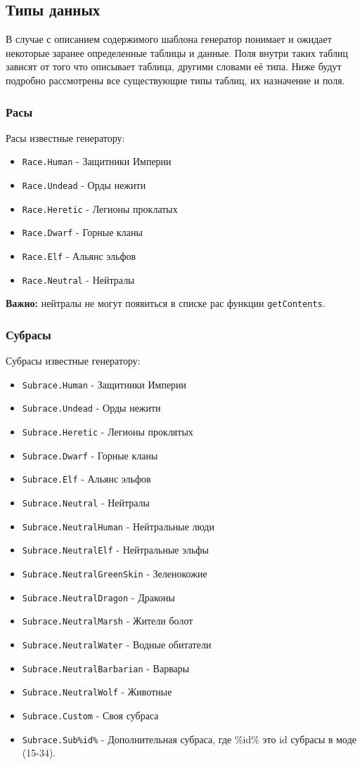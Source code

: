 \subsection{Типы данных}
В случае с описанием содержимого шаблона генератор понимает и ожидает некоторые заранее определенные таблицы и данные. Поля внутри таких таблиц зависят от того что описывает таблица, другими словами её типа. Ниже будут подробно рассмотрены все существующие типы таблиц, их назначение и поля.

\subsubsection{Расы}
\label{raceTypes}
Расы известные генератору:
\begin{itemize}
\item \texttt{Race.Human} - Защитники Империи
\item \texttt{Race.Undead} - Орды нежити
\item \texttt{Race.Heretic} - Легионы проклатых
\item \texttt{Race.Dwarf} - Горные кланы
\item \texttt{Race.Elf} - Альянс эльфов
\item \texttt{Race.Neutral} - Нейтралы
\end{itemize}
\textbf{Важно:} нейтралы не могут появиться в списке рас функции \texttt{getContents}.

\subsubsection{Субрасы}
\label{subraceTypes}
Субрасы известные генератору:
\begin{itemize}
\item \texttt{Subrace.Human} - Защитники Империи
\item \texttt{Subrace.Undead} - Орды нежити
\item \texttt{Subrace.Heretic} - Легионы проклятых
\item \texttt{Subrace.Dwarf} - Горные кланы
\item \texttt{Subrace.Elf} - Альянс эльфов
\item \texttt{Subrace.Neutral} - Нейтралы
\item \texttt{Subrace.NeutralHuman} - Нейтральные люди
\item \texttt{Subrace.NeutralElf} - Нейтральные эльфы
\item \texttt{Subrace.NeutralGreenSkin} - Зеленокожие
\item \texttt{Subrace.NeutralDragon} - Драконы
\item \texttt{Subrace.NeutralMarsh} - Жители болот
\item \texttt{Subrace.NeutralWater} - Водные обитатели
\item \texttt{Subrace.NeutralBarbarian} - Варвары
\item \texttt{Subrace.NeutralWolf} - Животные
\item \texttt{Subrace.Custom} - Своя субраса
\item \texttt{Subrace.Sub\%id\%} - Дополнительная субраса, где \%id\% это id субрасы в моде (15-34).
\end{itemize}

